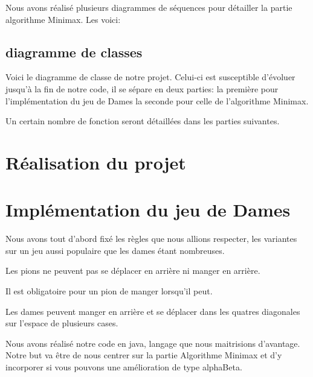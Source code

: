 \documentclass[12,french]{report}
\begin{document}
%
\begin{figure}
\centering{}
\end{figure}

\begin{figure}
\centering{}
\end{figure}


Nous avons réalisé plusieurs diagrammes de séquences pour détailler
la partie algorithme Minimax. Les voici:

\subsection{diagramme de classes}

%
\begin{figure}
\centering{}
\end{figure}



Voici le diagramme de classe de notre projet. Celui-ci est susceptible
d'évoluer jusqu'à la fin de notre code, il se sépare en deux parties:
la première pour l'implémentation du jeu de Dames la seconde pour
celle de l'algorithme Minimax.

Un certain nombre de fonction seront détaillées dans les parties suivantes.


\section{Réalisation du projet}

\section{Implémentation du jeu de Dames}

Nous avons tout d'abord fixé les règles que nous allions respecter,
les variantes sur un jeu aussi populaire que les dames étant nombreuses.

Les pions ne peuvent pas se déplacer en arrière ni manger en arrière. 

Il est obligatoire pour un pion de manger lorsqu'il peut.

Les dames peuvent manger en arrière et se déplacer dans les quatres
diagonales sur l'espace de plusieurs cases. 

Nous avons réalisé notre code en java, langage que nous maitrisions
d'avantage. Notre but va être de nous centrer sur la partie Algorithme
Minimax et d'y incorporer si vous pouvons une amélioration de type
alphaBeta.
\end{document}
